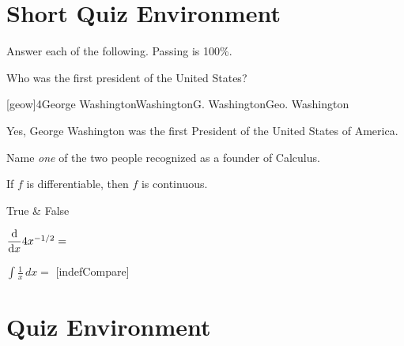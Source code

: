 \documentclass{article}
\def\D{\dfrac {\hbox{\text{d}}}{\text{d}x}}
\def\dPose#1{$\D#1=$ }
\begin{document}
\section{Short Quiz Environment}

\begin{shortquiz}
Answer each of the following. Passing is 100\%.

\begin{questions}

\answersEndHook{\hfill\makebox[0pt][r]{\sqTallyBox}}

\item Who was the first president of the United States?\par\kern3pt\noindent
{}[geow]{4}{George Washington}{Washington}{G. Washington}{Geo. Washington}\hfill
{}\cgBdry\sqTallyBox
\begin{solution}
Yes, George Washington was the first President of the United
States of America.
\end{solution}

\item Name \emph{one} of the two people recognized as a founder of
Calculus.\par\kern3pt\noindent
{}\hfill
{}\olBdry\sqTallyBox

\item If $f$ is differentiable, then $f$ is continuous.
\begin{answers}{4}
 True &
 False
\end{answers}

\item
\dPose {4 x^{-1/2}}\hfill
{}\olBdry\sqTallyBox

\item
$\displaystyle\int \frac 1x\,dx = $\space
{}[indefCompare]\hfill
{}\olBdry\sqTallyBox

\end{questions}
\end{shortquiz}
\begin{flushright}
\sqClearButton\olBdry\sqTallyTotal
\end{flushright}

\newpage
\section{Quiz Environment}
\end{document}
